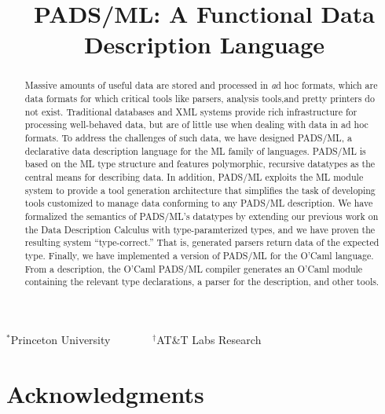 \documentclass[nocopyrightspace]{sigplanconf}
\begin{document}
\title{PADS/ML: A Functional Data Description Language}
{$^\ast$Princeton University \ \ \ \ \ \ \ $^\dagger$AT\&T Labs Research}
 { \ \ \ \ }



\maketitle{}

\begin{abstract}  

  Massive amounts of useful data are stored and processed in
  {\textit ad hoc formats}, which are data formats for which critical tools
  like parsers, analysis tools,and pretty printers do not
  exist. Traditional databases and XML systems provide rich
  infrastructure for processing well-behaved data, but are of little
  use when dealing with data in ad hoc formats.
  To address the challenges of such data, we have designed PADS/ML,
  a declarative data description language for the ML family of
  languages. PADS/ML is based on the ML type structure and features
  polymorphic, recursive datatypes as the central means for describing
  data. In addition, PADS/ML exploits the ML module system to
  provide a tool generation architecture that simplifies the task of
  developing tools customized to manage data conforming to any
  PADS/ML description. 
  We have formalized the semantics of PADS/ML's datatypes by extending
  our previous work on the Data Description Calculus with
  type-paramterized types, and we have proven the resulting system
  ``type-correct.'' That is, generated parsers return data of the
  expected type.
  Finally, we have implemented a version of PADS/ML for the O'Caml
  language.  From a description, the O'Caml PADS/ML compiler generates
  an O'Caml module containing the relevant type declarations, a parser
  for the description, and other tools.

\end{abstract}















\section*{Acknowledgments}




%


\end{document}

